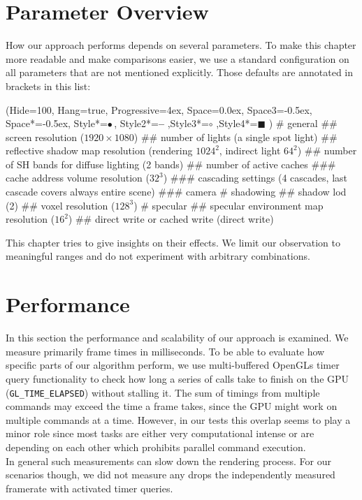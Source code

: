 \documentclass[thesis.tex]{subfiles}
\begin{document}
\section{Parameter Overview}
How our approach performs depends on several parameters.
To make this chapter more readable and make comparisons easier, we use a standard configuration on all parameters that are not mentioned explicitly.
Those defaults are annotated in brackets in this list:
\begin{easylist}
\ListProperties(Hide=100, Hang=true, Progressive=4ex, Space=0.0ex, Space3=-0.5ex, Space*=-0.5ex, Style*=$\bullet\,$,
Style2*=\textbf{--} ,Style3*=$\circ$ ,Style4*=\tiny$\blacksquare$ )
# general
## screen resolution ($1920\times1080$)
## number of lights (a single spot light)
## reflective shadow map resolution (rendering $1024^2$, indirect light $64^2$)
## number of SH bands for diffuse lighting (2 bands)
## number of active caches
### cache address volume resolution ($32^3$)
### cascading settings (4 cascades, last cascade covers always entire scene)
### camera
# shadowing
## shadow lod (2)
## voxel resolution ($128^3$)
# specular
## specular environment map resolution ($16^2$)
## direct write or cached write (direct write)
\end{easylist}
This chapter tries to give insights on their effects.
We limit our observation to meaningful ranges and do not experiment with arbitrary combinations.


\section{Performance}
In this section the performance and scalability of our approach is examined.
We measure primarily frame times in milliseconds.
To be able to evaluate how specific parts of our algorithm perform, we use multi-buffered OpenGLs timer query functionality to check how long a series of calls take to finish on the GPU (\texttt{GL\_TIME\_ELAPSED}) without stalling it.
The sum of timings from multiple commands may exceed the time a frame takes, since the GPU might work on multiple commands at a time.
However, in our tests this overlap seems to play a minor role since most tasks are either very computational intense or are depending on each other which prohibits parallel command execution.
\\
In general such measurements can slow down the rendering process.
For our scenarios though, we did not measure any drops the independently measured framerate with activated timer queries.
\end{document}
